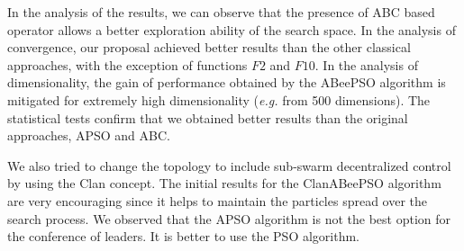 In the analysis of the results, we can observe that the presence of ABC based operator allows a better exploration ability of the search space. In the analysis of convergence, our proposal achieved better results than the other classical approaches, with the exception of functions $F2$ and $F10$. In the analysis of dimensionality, the gain of performance obtained by the ABeePSO algorithm is mitigated for extremely high dimensionality (\textit{e.g.} from 500 dimensions). The statistical tests confirm that we obtained better results than the original approaches, APSO and ABC.

We also tried to change the topology to include sub-swarm decentralized control by using the Clan concept. The initial results for the ClanABeePSO algorithm are very encouraging since it helps to maintain the particles spread over the search process. We observed that the APSO algorithm is not the best option for the conference of leaders. It is better to use the PSO algorithm. %



